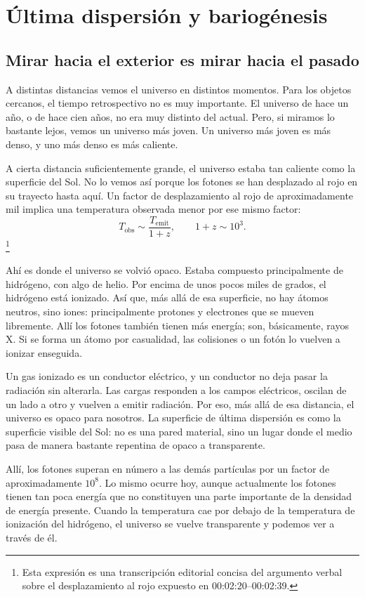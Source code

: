 \chapter{Última dispersión y bariogénesis}

\section{Mirar hacia el exterior es mirar hacia el pasado}

A distintas distancias vemos el universo en distintos momentos. Para los objetos cercanos, el tiempo retrospectivo no es muy importante. El universo de hace un año, o de hace cien años, no era muy distinto del actual. Pero, si miramos lo bastante lejos, vemos un universo más joven. Un universo más joven es más denso, y uno más denso es más caliente.

A cierta distancia suficientemente grande, el universo estaba tan caliente como la superficie del Sol. No lo vemos así porque los fotones se han desplazado al rojo en su trayecto hasta aquí. Un factor de desplazamiento al rojo de aproximadamente mil implica una temperatura observada menor por ese mismo factor:
\[
T_{\mathrm{obs}} \sim \frac{T_{\mathrm{emit}}}{1+z},
\qquad
1+z \sim 10^3.
\]\footnote{Esta expresión es una transcripción editorial concisa del argumento verbal sobre el desplazamiento al rojo expuesto en 00:02:20--00:02:39.}

Ahí es donde el universo se volvió opaco. Estaba compuesto principalmente de hidrógeno, con algo de helio. Por encima de unos pocos miles de grados, el hidrógeno está ionizado. Así que, más allá de esa superficie, no hay átomos neutros, sino iones: principalmente protones y electrones que se mueven libremente. Allí los fotones también tienen más energía; son, básicamente, rayos X. Si se forma un átomo por casualidad, las colisiones o un fotón lo vuelven a ionizar enseguida.

Un gas ionizado es un conductor eléctrico, y un conductor no deja pasar la radiación sin alterarla. Las cargas responden a los campos eléctricos, oscilan de un lado a otro y vuelven a emitir radiación. Por eso, más allá de esa distancia, el universo es opaco para nosotros. La superficie de última dispersión es como la superficie visible del Sol: no es una pared material, sino un lugar donde el medio pasa de manera bastante repentina de opaco a transparente.

Allí, los fotones superan en número a las demás partículas por un factor de aproximadamente \(10^8\). Lo mismo ocurre hoy, aunque actualmente los fotones tienen tan poca energía que no constituyen una parte importante de la densidad de energía presente. Cuando la temperatura cae por debajo de la temperatura de ionización del hidrógeno, el universo se vuelve transparente y podemos ver a través de él.

